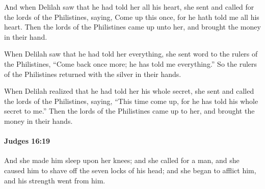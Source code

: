 			\begin{versebox}
					\item[BHS] 
					\item[ASV] And when Delilah saw that he had told her all his heart, she sent and called for the lords of the Philistines, saying, Come up this once, for he hath told me all his heart. Then the lords of the Philistines came up unto her, and brought the money in their hand.
					\item[NIV] When Delilah saw that he had told her everything, she sent word to the rulers of the Philistines, “Come back once more; he has told me everything.” So the rulers of the Philistines returned with the silver in their hands.
					\item[NRSV] When Delilah realized that he had told her his whole secret, she sent and called the lords of the Philistines, saying, “This time come up, for he has told his whole secret to me.” Then the lords of the Philistines came up to her, and brought the money in their hands.
			\end{versebox}

		\paragraph{Judges 16:19} %
			\label{JUDGES-16-19}

			And she made him sleep upon her knees; and she called for a man, and she caused him to shave off the seven locks of his head; and she began to afflict him, and his strength went from him.


